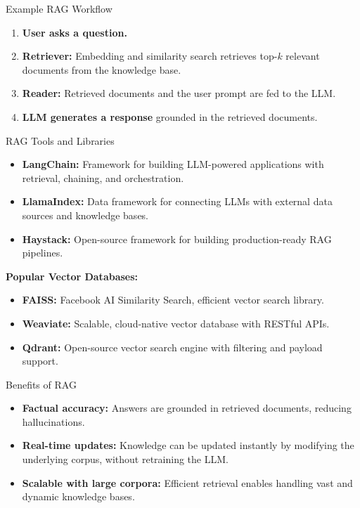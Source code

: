 \begin{frame}{Example RAG Workflow}
    \begin{enumerate}
        \setlength{\itemsep}{1em}
        \item \textbf{User asks a question.}
        \item \textbf{Retriever:} Embedding and similarity search retrieves top-$k$ relevant documents from the knowledge base.
        \item \textbf{Reader:} Retrieved documents and the user prompt are fed to the LLM.
        \item \textbf{LLM generates a response} grounded in the retrieved documents.
    \end{enumerate}
\end{frame}


\begin{frame}{RAG Tools and Libraries}
    \begin{itemize}
        \setlength{\itemsep}{1em}
        \item \textbf{LangChain:} Framework for building LLM-powered applications with retrieval, chaining, and orchestration.
        \item \textbf{LlamaIndex:} Data framework for connecting LLMs with external data sources and knowledge bases.
        \item \textbf{Haystack:} Open-source framework for building production-ready RAG pipelines.
    \end{itemize}
    \vspace{1em}
    \textbf{Popular Vector Databases:}
    \begin{itemize}
        \item \textbf{FAISS:} Facebook AI Similarity Search, efficient vector search library.
        \item \textbf{Weaviate:} Scalable, cloud-native vector database with RESTful APIs.
        \item \textbf{Qdrant:} Open-source vector search engine with filtering and payload support.
    \end{itemize}
\end{frame}


\begin{frame}{Benefits of RAG}
    \begin{itemize}
        \setlength{\itemsep}{1em}
        \item \textbf{Factual accuracy:} Answers are grounded in retrieved documents, reducing hallucinations.
        \item \textbf{Real-time updates:} Knowledge can be updated instantly by modifying the underlying corpus, without retraining the LLM.
        \item \textbf{Scalable with large corpora:} Efficient retrieval enables handling vast and dynamic knowledge bases.
    \end{itemize}
\end{frame}


